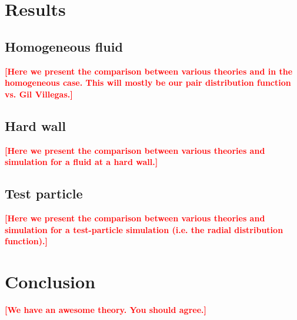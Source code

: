 \documentclass[letterpaper,twocolumn,amsmath,amssymb,pre,aps,10pt]{revtex4-1}
\newcommand\fixme[1]{\textcolor{red}{\textbf{[#1]}}}
\begin{document}

\section{Results}

\subsection{Homogeneous fluid}

\fixme{Here we present the comparison between various theories and in
  the homogeneous case.  This will mostly be our pair distribution
  function vs. Gil Villegas.}

\subsection{Hard wall}

\fixme{Here we present the comparison between various theories and
  simulation for a fluid at a hard wall.}

\subsection{Test particle}

\fixme{Here we present the comparison between various theories and
  simulation for a test-particle simulation (i.e. the radial
  distribution function).}

\section{Conclusion}

\fixme{We have an awesome theory. You should agree.}

\end{document}
